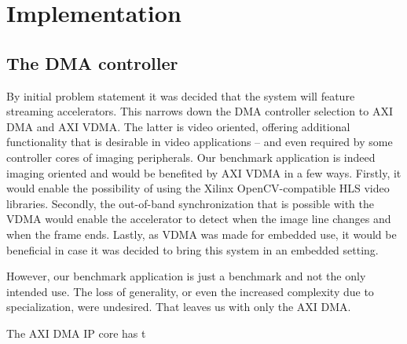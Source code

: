 \section{Implementation}

\subsection{The DMA controller}

By initial problem statement it was decided that the system will feature
streaming accelerators. This narrows down the DMA controller selection
to AXI DMA and AXI VDMA. The latter is video oriented, offering additional
functionality that is desirable in video applications -- and even required
by some controller cores of imaging peripherals. Our benchmark application
is indeed imaging oriented and would be benefited by AXI VDMA in a few ways.
Firstly, it would enable the possibility of using the Xilinx OpenCV-compatible
HLS video libraries. Secondly, the out-of-band synchronization that is possible
with the VDMA would enable the accelerator to detect when the image line changes
and when the frame ends. Lastly, as VDMA was made for embedded use, it would be
beneficial in case it was decided to bring this system in an embedded setting.

However, our benchmark application is just a benchmark and not the only intended use.
The loss of generality, or even the increased complexity due to specialization,
were undesired. That leaves us with only the AXI DMA.

The AXI DMA IP core has t

